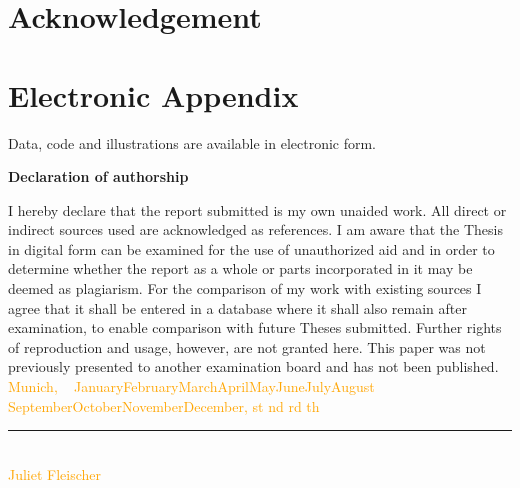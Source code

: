 \documentclass[12pt]{article}
\newcommand{\myname}{\large Juliet Fleischer}
\newcommand{\thesuffix}[1]{%
  \ifnum#1=1 st%
  \else\ifnum#1=2 nd%
  \else\ifnum#1=3 rd%
  \else th%
  \fi\fi\fi}
\newcommand{\mydate}{%
  ~\ifcase\month\or
  January\or February\or March\or April\or May\or June\or July\or August\or
  September\or October\or November\or December\fi, \the\day\thesuffix{\day} \number\year}
\begin{document}
\listoftables
% 

\newpage

\newpage
\section*{Acknowledgement}

\newpage

    

\setcounter{page}{5} %

\appendix

% 

\section{Electronic Appendix}
\label{el_app}


Data, code and illustrations are available in electronic form. \bigskip

% 


\RaggedRight
% 
% 
\printbibliography
\newpage
\Large
\noindent
\textbf{Declaration of authorship} 
\vspace{0.5cm}
\noindent
\normalsize

I hereby declare that the report submitted is my own unaided work. All direct 
or indirect sources used are acknowledged as references. I am aware that the 
Thesis in digital form can be examined for the use of unauthorized aid and in 
order to determine whether the report as a whole or parts incorporated in it may 
be deemed as plagiarism. For the comparison of my work with existing sources I 
agree that it shall be entered in a database where it shall also remain after 
examination, to enable comparison with future Theses submitted. Further rights 
of reproduction and usage, however, are not granted here. This paper was not 
previously presented to another examination board and has not been published.
\\

\vspace{1cm}
\textcolor{orange}{Munich, \mydate} \\

\vspace{3cm}

\noindent\rule{0.5\textwidth}{0.4pt} \\

\textcolor{orange}{\myname}
\end{document}
